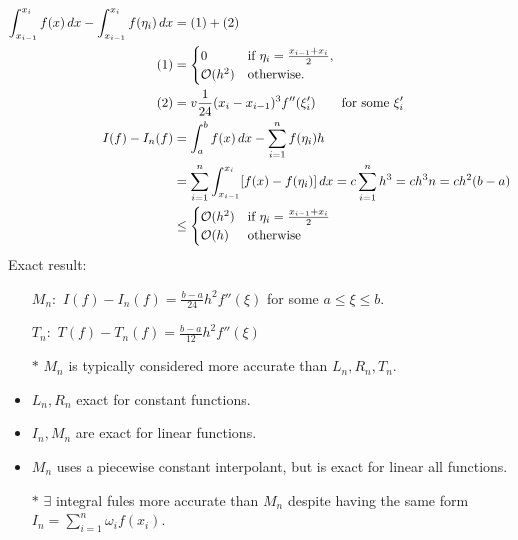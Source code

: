 \documentclass[]{article}
\begin{document}
\begin{align*}
	\int_{x_{i-1}}^{x_i}f(x)\,dx - \int_{x_{i-1}}^{x_i} f(\eta_i)\,dx 
	&= (1) + (2) \\
	(1) &= \begin{cases} 0 & \text{if } \eta_i = \frac{x_{i-1}+x_i}2, \\ \mathcal{O}(h^2) & \text{otherwise}. \end{cases} \\
	(2) &= v\frac1{24}(x_i-x_{i-1})^3 f''(\xi_i') \qquad \text{for some }\xi_i' \\
	I(f) - I_n(f) &= \int_a^b f(x)\,dx- \sum_{i=1}^n f(\eta_i)h \\
				  &= \sum_{i=1}^n \int_{x_{i-1}}^{x_i} [f(x)-f(\eta_i)]\,dx = c\sum_{i=1}^n h^3 = ch^3n = ch^2(b-a) \\
				  &\leq \begin{cases} \mathcal{O}(h^2) & \text{if } \eta_i = \frac{x_{i-1}+x_i}2 \\ \mathcal{O}(h) & \text{otherwise} \end{cases}
\end{align*}
Exact result:
\begin{itemize}
	\item[$M_n:$] $I(f)-I_n(f)=\frac{b-a}{24} h^2 f''(\xi)$ for some $a\leq\xi\leq b$.
	\item[$T_n:$] $T(f)-T_n(f)=\frac{b-a}{12} h^2 f''(\xi)$
	\item[$*$] $M_n$ is typically considered more accurate than $L_n,R_n,T_n$.
	\item $L_n,R_n$ exact for constant functions.
	\item $I_n,M_n$ are exact for linear functions.
	\item $M_n$ uses a piecewise constant interpolant, but is exact for linear all functions.
	\item[$*$] $\exists$ integral fules more accurate than $M_n$ despite having the same form $I_n = \sum_{i=1}^n \omega_i f(x_i)$.
\end{itemize}
\end{document}
